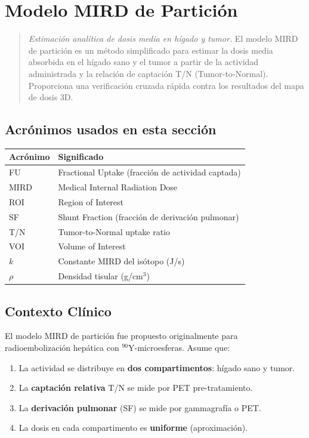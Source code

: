 \documentclass[12pt,a4paper]{article}
\begin{document}
\section{Modelo MIRD de Partición}

\begin{quote}
\textit{Estimación analítica de dosis media en hígado y tumor.} El modelo MIRD de partición es un método simplificado para estimar la dosis media absorbida en el hígado sano y el tumor a partir de la actividad administrada y la relación de captación T/N (Tumor-to-Normal). Proporciona una verificación cruzada rápida contra los resultados del mapa de dosis 3D.
\end{quote}

\subsection*{Acrónimos usados en esta sección}

\begin{tabular}{p{3cm} p{12cm}}
\toprule
\textbf{Acrónimo} & \textbf{Significado} \\
\midrule
FU & Fractional Uptake (fracción de actividad captada) \\
MIRD & Medical Internal Radiation Dose \\
ROI & Region of Interest \\
SF & Shunt Fraction (fracción de derivación pulmonar) \\
T/N & Tumor-to-Normal uptake ratio \\
VOI & Volume of Interest \\
$k$ & Constante MIRD del isótopo (J/s) \\
$\rho$ & Densidad tisular (g/cm$^3$) \\
\bottomrule
\end{tabular}

\subsection{Contexto Clínico}

El modelo MIRD de partición fue propuesto originalmente para radioembolización hepática con $^{90}$Y-microesferas. Asume que:

\begin{enumerate}
  \item La actividad se distribuye en \textbf{dos compartimentos}: hígado sano y tumor.
  \item La \textbf{captación relativa} T/N se mide por PET pre-tratamiento.
  \item La \textbf{derivación pulmonar} (SF) se mide por gammagrafía o PET.
  \item La dosis en cada compartimento es \textbf{uniforme} (aproximación).
\end{enumerate}
\end{document}
